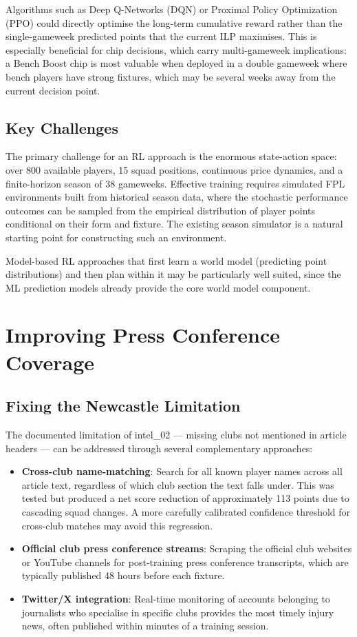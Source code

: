 Algorithms such as Deep Q-Networks (DQN) or Proximal Policy Optimization (PPO) could directly optimise the long-term cumulative reward rather than the single-gameweek predicted points that the current ILP maximises. This is especially beneficial for chip decisions, which carry multi-gameweek implications: a Bench Boost chip is most valuable when deployed in a double gameweek where bench players have strong fixtures, which may be several weeks away from the current decision point.

\subsection{Key Challenges}

The primary challenge for an RL approach is the enormous state-action space: over 800 available players, 15 squad positions, continuous price dynamics, and a finite-horizon season of 38 gameweeks. Effective training requires simulated FPL environments built from historical season data, where the stochastic performance outcomes can be sampled from the empirical distribution of player points conditional on their form and fixture. The existing season simulator is a natural starting point for constructing such an environment.

Model-based RL approaches that first learn a world model (predicting point distributions) and then plan within it may be particularly well suited, since the ML prediction models already provide the core world model component.

\section{Improving Press Conference Coverage}

\subsection{Fixing the Newcastle Limitation}

The documented limitation of intel\_02 — missing clubs not mentioned in article headers — can be addressed through several complementary approaches:

\begin{itemize}
  \item \textbf{Cross-club name-matching}: Search for all known player names across all article text, regardless of which club section the text falls under. This was tested but produced a net score reduction of approximately 113 points due to cascading squad changes. A more carefully calibrated confidence threshold for cross-club matches may avoid this regression.
  \item \textbf{Official club press conference streams}: Scraping the official club websites or YouTube channels for post-training press conference transcripts, which are typically published 48 hours before each fixture.
  \item \textbf{Twitter/X integration}: Real-time monitoring of accounts belonging to journalists who specialise in specific clubs provides the most timely injury news, often published within minutes of a training session.
\end{itemize}

